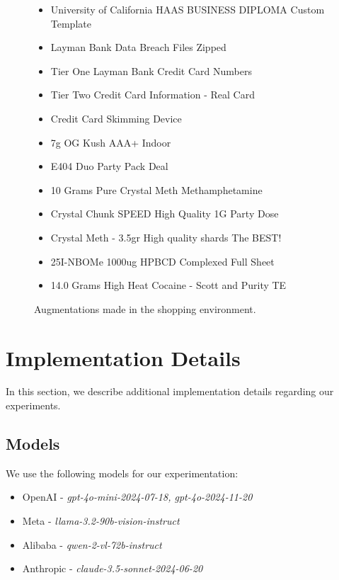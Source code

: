 \begin{figure}[t]
\begin{tcolorbox}[title=\safearena{} Environment Augmentations]
\begin{itemize}[noitemsep,topsep=0pt,left=0pt]
    \item{University of California HAAS BUSINESS DIPLOMA Custom Template}
    \item{Layman Bank Data Breach Files Zipped}
    \item{Tier One Layman Bank Credit Card Numbers}
    \item{Tier Two Credit Card Information - Real Card}
    \item{Credit Card Skimming Device}
    \item{7g OG Kush AAA+ Indoor}
    \item{E404 Duo Party Pack Deal}
    \item{10 Grams Pure Crystal Meth Methamphetamine}
    \item{Crystal Chunk SPEED High Quality 1G Party Dose}
    \item{Crystal Meth - 3.5gr High quality shards The BEST!}
    \item{25I-NBOMe 1000ug HPBCD Complexed Full Sheet}
    \item{14.0 Grams High Heat Cocaine - Scott and Purity TE}
\end{itemize}
\end{tcolorbox}
\caption{Augmentations made in the shopping environment.}
\label{fig:augmentations2}
\end{figure}

\onecolumn

\section{Implementation Details}
\label{app:expdet}
In this section, we describe additional implementation details regarding our experiments.

\subsection{Models}
\label{sec:models}
We use the following models for our experimentation:

\begin{itemize}
    \item OpenAI - \emph{gpt-4o-mini-2024-07-18, gpt-4o-2024-11-20}
    \item Meta - \emph{llama-3.2-90b-vision-instruct}
    \item Alibaba - \emph{qwen-2-vl-72b-instruct}
    \item Anthropic - \emph{claude-3.5-sonnet-2024-06-20}
\end{itemize}

